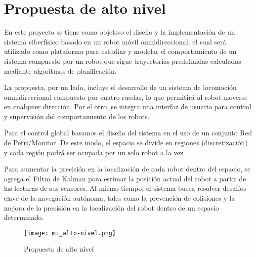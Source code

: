 \chapter{Propuesta de alto nivel}

En este proyecto se tiene como objetivo el diseño y la implementación de un sistema ciberfísico basado en un robot móvil omnidireccional, el cual será utilizado como plataforma para estudiar y modelar el comportamiento de un sistema compuesto por un robot que sigue trayectorias predefinidas calculadas mediante algoritmos de planificación.

La propuesta, por un lado, incluye el desarrollo de un sistema de locomoción omnidireccional compuesto por cuatro ruedas, lo que permitirá al robot moverse en cualquier dirección. Por el otro, se integra una interfaz de usuario para  control y supervisión del comportamiento de los robots.

Para el control global basamos el diseño del sistema en el uso de un conjunto Red de Petri/Monitor. De este modo, el espacio se divide en regiones (discretización) y cada región podrá ser ocupada por un solo robot a la vez.

Para aumentar la precisión en la localización de cada robot dentro del espacio, se agrega el Filtro de Kalman para estimar la posición actual del robot a partir de las lecturas de sus sensores. Al mismo tiempo, el sistema busca resolver desafíos clave de la navegación autónoma, tales como la prevención de colisiones y la mejora de la precisión en la localización del robot dentro de un espacio determinado.

\begin{figure}[H]
    \centering
    \texttt{[image: mt\_alto-nivel.png]}
    \caption{Propuesta de alto nivel}
    \label{fig:propaltonivel}
\end{figure}

